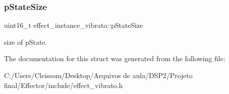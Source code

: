 \subsubsection{\texorpdfstring{p\+State\+Size}{pStateSize}}
{\footnotesize\ttfamily uint16\+\_\+t effect\+\_\+instance\+\_\+vibrato\+::p\+State\+Size}

size of p\+State. 

The documentation for this struct was generated from the following file\+:\begin{DoxyCompactItemize}
\item 
C\+:/\+Users/\+Cleissom/\+Desktop/\+Arquivos de aula/\+D\+S\+P2/\+Projeto final/\+Effector/include/effect\+\_\+vibrato.\+h\end{DoxyCompactItemize}
